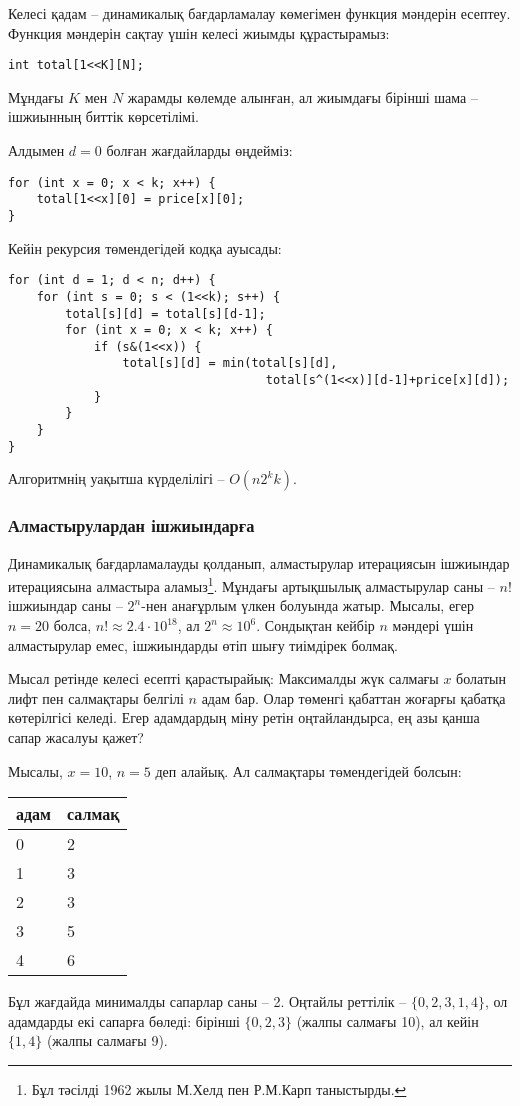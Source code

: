 Келесі қадам -- динамикалық бағдарламалау көмегімен функция мәндерін есептеу.
Функция мәндерін сақтау үшін келесі жиымды құрастырамыз: 
\begin{lstlisting}
int total[1<<K][N];
\end{lstlisting}
Мұндағы $K$ мен $N$ жарамды көлемде алынған, ал жиымдағы бірінші шама -- ішжиынның биттік көрсетілімі.

Алдымен $d=0$ болған жағдайларды өңдейміз:
\begin{lstlisting}
for (int x = 0; x < k; x++) {
    total[1<<x][0] = price[x][0];
}
\end{lstlisting}
Кейін рекурсия төмендегідей кодқа ауысады:
\begin{lstlisting}
for (int d = 1; d < n; d++) {
    for (int s = 0; s < (1<<k); s++) {
        total[s][d] = total[s][d-1];
        for (int x = 0; x < k; x++) {
            if (s&(1<<x)) {
                total[s][d] = min(total[s][d],
                                    total[s^(1<<x)][d-1]+price[x][d]);
            }
        }
    }
}
\end{lstlisting}
Алгоритмнің уақытша күрделілігі -- $O(n 2^k k)$.

\subsubsection{Алмастырулардан ішжиындарға} %

Динамикалық бағдарламалауды қолданып, алмастырулар итерациясын
ішжиындар итерациясына алмастыра аламыз\footnote{Бұл
тәсілді 1962 жылы М.Хелд пен Р.М.Карп таныстырды\cite{hel62}.}.
Мұндағы артықшылық алмастырулар саны -- $n!$ ішжиындар саны -- $2^n$-нен
анағұрлым үлкен болуында жатыр. Мысалы, егер $n=20$ болса, 
$n! \approx 2.4 \cdot 10^{18}$, ал $2^n \approx 10^6$.
Сондықтан кейбір $n$ мәндері үшін алмастырулар емес, ішжиындарды
өтіп шығу тиімдірек болмақ.

Мысал ретінде келесі есепті қарастырайық:
Максималды жүк салмағы $x$ болатын лифт пен 
салмақтары белгілі $n$ адам бар. Олар төменгі
қабаттан жоғарғы қабатқа көтерілгісі келеді.
Егер адамдардың міну ретін оңтайландырса,
ең азы қанша сапар жасалуы қажет?

Мысалы, $x=10$, $n=5$ деп алайық. Ал
салмақтары төмендегідей болсын: 
\begin{center}
\begin{tabular}{ll}
адам & салмақ \\
\hline
0 & 2 \\
1 & 3 \\
2 & 3 \\
3 & 5 \\
4 & 6 \\
\end{tabular}
\end{center}
Бұл жағдайда минималды сапарлар саны -- 2.
Оңтайлы реттілік -- $\{0,2,3,1,4\}$, ол
адамдарды екі сапарға бөледі: бірінші $\{0,2,3\}$ (жалпы салмағы 10),
ал кейін $\{1,4\}$ (жалпы салмағы 9).

